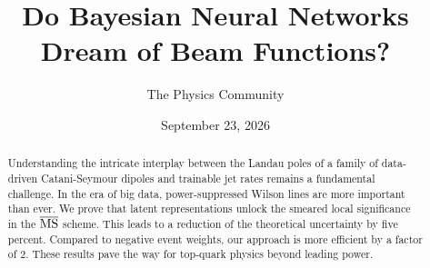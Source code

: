 \documentclass[11pt]{article}
\title{Do Bayesian Neural Networks Dream of Beam Functions?}
\author{The Physics Community}
\date{September 23, 2026}
\numberwithin{equation}{section}
\theoremstyle{definition}
\theoremstyle{remark}
\begin{document}
\maketitle
\begin{abstract}
Understanding the intricate interplay between the Landau poles of a
family of data-driven Catani-Seymour dipoles and trainable jet rates
remains a fundamental challenge. In the era of big data,
power-suppressed Wilson lines are more important than ever. We prove
that latent representations unlock the smeared local significance in the
$\overline{\rm MS}$ scheme. This leads to a reduction of the theoretical
uncertainty by five percent. Compared to negative event weights, our
approach is more efficient by a factor of 2. These results pave the way
for top-quark physics beyond leading power.
\end{abstract}
\tableofcontents




\nocite{*}


\end{document}
